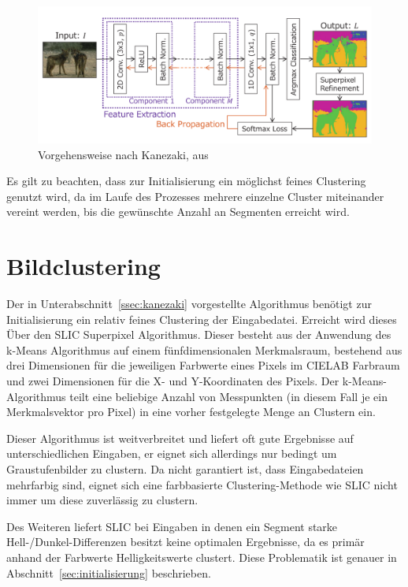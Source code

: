 \begin{figure}[h!]
	\centering
	\includegraphics[width=.8\textwidth,keepaspectratio]{images/Kan18_01.png}
	\caption{Vorgehensweise nach Kanezaki, aus \cite{kanezaki_18}}
	\label{fig:Kan18_01}
\end{figure}

Es gilt zu beachten, dass zur Initialisierung ein möglichst feines Clustering genutzt wird, da im Laufe des Prozesses mehrere einzelne Cluster miteinander vereint werden, bis die gewünschte Anzahl an Segmenten erreicht wird.

\section{Bildclustering}
\label{ssec:clustering}

Der in Unterabschnitt~\ref{ssec:kanezaki} vorgestellte Algorithmus benötigt zur Initialisierung ein relativ feines Clustering der Eingabedatei. Erreicht wird dieses Über den SLIC Superpixel Algorithmus. Dieser besteht aus der Anwendung des k-Means Algorithmus auf einem fünfdimensionalen Merkmalsraum, bestehend aus drei Dimensionen für die jeweiligen Farbwerte eines Pixels im CIELAB Farbraum und zwei Dimensionen für die X- und Y-Koordinaten des Pixels. \cite{achanta_10} Der k-Means-Algorithmus teilt eine beliebige Anzahl von Messpunkten (in diesem Fall je ein Merkmalsvektor pro Pixel) in eine vorher festgelegte Menge an Clustern ein.

Dieser Algorithmus ist weitverbreitet und liefert oft gute Ergebnisse auf unterschiedlichen Eingaben, er eignet sich allerdings nur bedingt um Graustufenbilder zu clustern. Da nicht garantiert ist, dass Eingabedateien mehrfarbig sind, eignet sich eine farbbasierte Clustering-Methode wie SLIC nicht immer um diese zuverlässig zu clustern. 

Des Weiteren liefert SLIC bei Eingaben in denen ein Segment starke Hell-/Dunkel-Differenzen besitzt keine optimalen Ergebnisse, da es primär anhand der Farbwerte \bzw Helligkeitswerte clustert. Diese Problematik ist genauer in Abschnitt~\ref{sec:initialisierung} beschrieben.

